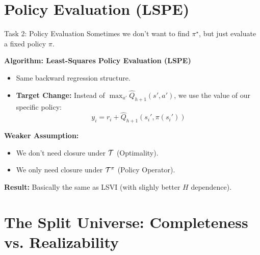 \documentclass[aspectratio=169]{beamer}
\begin{document}
\section{Policy Evaluation (LSPE)}

\begin{frame}{Task 2: Policy Evaluation}
    Sometimes we don't want to find $\pi^\star$, but just evaluate a fixed policy $\pi$.

    \vspace{0.3cm}

   \textbf{Algorithm: Least-Squares Policy Evaluation (LSPE)}
    \begin{itemize}
        \item Same backward regression structure.
        \item \textbf{Target Change:} Instead of $\max_{a'} \widehat{Q}_{h+1}(s', a')$, we use the value of our specific policy:
        \[
        y_i = r_i + \widehat{Q}_{h+1}(s_i', \pi(s_i'))
        \]
    \end{itemize}

    \vspace{0.3cm}
   \textbf{Weaker Assumption:}
    \begin{itemize}
        \item We don't need closure under $\mathcal{T}$ (Optimality).
        \item We only need closure under $\mathcal{T}^\pi$ (Policy Operator).
        \end{itemize}

        \textbf{Result:}
    Basically the same as LSVI (with slighly better $H$ dependence).
\end{frame}


\section{The Split Universe: Completeness vs. Realizability}
\end{document}
